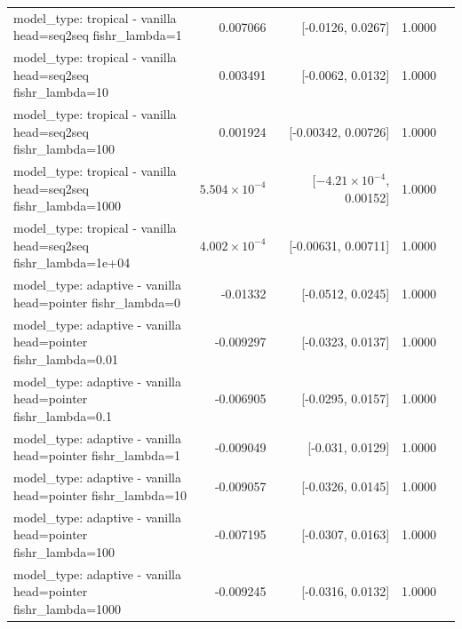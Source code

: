 \documentclass[10pt]{article}
\makeatletter
\newcommand{\stackcell}[1]{\begin{tabular}[t]{@{}l@{}}#1\end{tabular}}
\makeatother
\begin{document}
{\begin{longtable}{lrrrl}
\stackcell{model\_type: tropical - vanilla\\\footnotesize head=seq2seq fishr\_lambda=1 } & 0.007066 & [-0.0126, 0.0267] & 1.0000 & \\
\stackcell{model\_type: tropical - vanilla\\\footnotesize head=seq2seq fishr\_lambda=10 } & 0.003491 & [-0.0062, 0.0132] & 1.0000 & \\
\stackcell{model\_type: tropical - vanilla\\\footnotesize head=seq2seq fishr\_lambda=100 } & 0.001924 & [-0.00342, 0.00726] & 1.0000 & \\
\stackcell{model\_type: tropical - vanilla\\\footnotesize head=seq2seq fishr\_lambda=1000 } & $5.504\times10^{-4}$ & [$-4.21\times10^{-4}$, 0.00152] & 1.0000 & \\
\stackcell{model\_type: tropical - vanilla\\\footnotesize head=seq2seq fishr\_lambda=1e+04 } & $4.002\times10^{-4}$ & [-0.00631, 0.00711] & 1.0000 & \\
\stackcell{model\_type: adaptive - vanilla\\\footnotesize head=pointer fishr\_lambda=0 } & -0.01332 & [-0.0512, 0.0245] & 1.0000 & \\
\stackcell{model\_type: adaptive - vanilla\\\footnotesize head=pointer fishr\_lambda=0.01 } & -0.009297 & [-0.0323, 0.0137] & 1.0000 & \\
\stackcell{model\_type: adaptive - vanilla\\\footnotesize head=pointer fishr\_lambda=0.1 } & -0.006905 & [-0.0295, 0.0157] & 1.0000 & \\
\stackcell{model\_type: adaptive - vanilla\\\footnotesize head=pointer fishr\_lambda=1 } & -0.009049 & [-0.031, 0.0129] & 1.0000 & \\
\stackcell{model\_type: adaptive - vanilla\\\footnotesize head=pointer fishr\_lambda=10 } & -0.009057 & [-0.0326, 0.0145] & 1.0000 & \\
\stackcell{model\_type: adaptive - vanilla\\\footnotesize head=pointer fishr\_lambda=100 } & -0.007195 & [-0.0307, 0.0163] & 1.0000 & \\
\stackcell{model\_type: adaptive - vanilla\\\footnotesize head=pointer fishr\_lambda=1000 } & -0.009245 & [-0.0316, 0.0132] & 1.0000 & \\

\end{longtable}}
\end{document}
